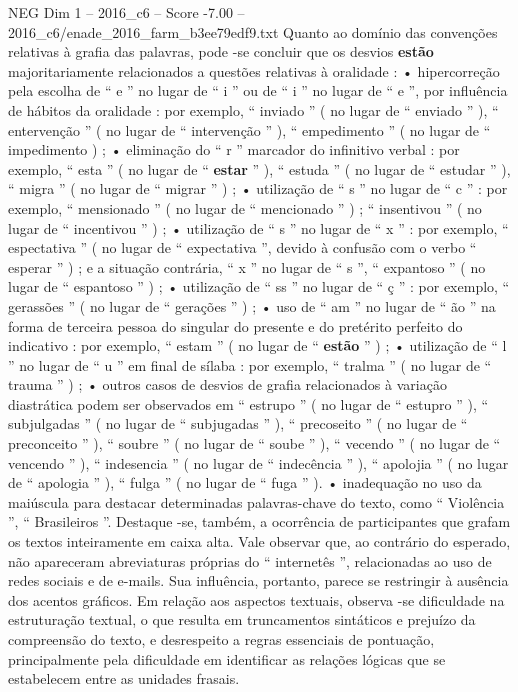 \begin{textsample}{NEG Dim 1 – 2016\_c6 – Score -7.00 – 2016\_c6/enade\_2016\_farm\_b3ee79edf9.txt}
Quanto ao domínio das convenções relativas à grafia das palavras, pode -se concluir que os desvios \textbf{estão} majoritariamente relacionados a questões relativas à oralidade : • hipercorreção pela escolha de “ e ” no lugar de “ i ” ou de “ i ” no lugar de “ e ”, por influência de hábitos da oralidade : por exemplo, “ inviado ” ( no lugar de “ enviado ” ), “ entervenção ” ( no lugar de “ intervenção ” ), “ empedimento ” ( no lugar de “ impedimento ) ; • eliminação do “ r ” marcador do infinitivo verbal : por exemplo, “ esta ” ( no lugar de “ \textbf{estar} ” ), “ estuda ” ( no lugar de “ estudar ” ), “ migra ” ( no lugar de “ migrar ” ) ; • utilização de “ s ” no lugar de “ c ” : por exemplo, “ mensionado ” ( no lugar de “ mencionado ” ) ; “ insentivou ” ( no lugar de “ incentivou ” ) ; • utilização de “ s ” no lugar de “ x ” : por exemplo, “ espectativa ” ( no lugar de “ expectativa ”, devido à confusão com o verbo “ esperar ” ) ; e a situação contrária, “ x ” no lugar de “ s ”, “ expantoso ” ( no lugar de “ espantoso ” ) ; • utilização de “ ss ” no lugar de “ ç ” : por exemplo, “ gerassões ” ( no lugar de “ gerações ” ) ; • uso de “ am ” no lugar de “ ão ” na forma de terceira pessoa do singular do presente e do pretérito perfeito do indicativo : por exemplo, “ estam ” ( no lugar de “ \textbf{estão} ” ) ; • utilização de “ l ” no lugar de “ u ” em final de sílaba : por exemplo, “ tralma ” ( no lugar de “ trauma ” ) ; • outros casos de desvios de grafia relacionados à variação diastrática podem ser observados em “ estrupo ” ( no lugar de “ estupro ” ), “ subjulgadas ” ( no lugar de “ subjugadas ” ), “ precoseito ” ( no lugar de “ preconceito ” ), “ soubre ” ( no lugar de “ soube ” ), “ vecendo ” ( no lugar de “ vencendo ” ), “ indesencia ” ( no lugar de “ indecência ” ), “ apolojia ” ( no lugar de “ apologia ” ), “ fulga ” ( no lugar de “ fuga ” ). • inadequação no uso da maiúscula para destacar determinadas palavras-chave do texto, como “ Violência ”, “ Brasileiros ”.
Destaque -se, também, a ocorrência de participantes que grafam os textos inteiramente em caixa alta.
Vale observar que, ao contrário do esperado, não apareceram abreviaturas próprias do “ internetês ”, relacionadas ao uso de redes sociais e de e-mails.
Sua influência, portanto, parece se restringir à ausência dos acentos gráficos.
Em relação aos aspectos textuais, observa -se dificuldade na estruturação textual, o que resulta em truncamentos sintáticos e prejuízo da compreensão do texto, e desrespeito a regras essenciais de pontuação, principalmente pela dificuldade em identificar as relações lógicas que se estabelecem entre as unidades frasais.

\end{textsample}
